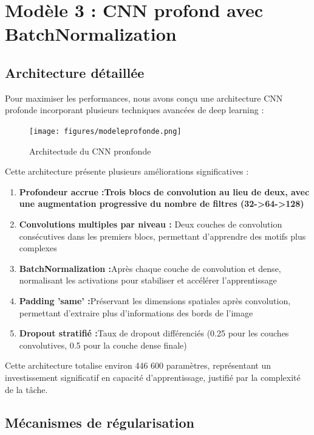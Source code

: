 \section{Modèle 3 : CNN profond avec BatchNormalization}

\subsection{Architecture détaillée}
\begin{flushleft}
Pour maximiser les performances, nous avons conçu une architecture CNN profonde incorporant plusieurs techniques avancées de deep learning :
\end{flushleft}

\begin{figure}[H]
\centering
\texttt{[image: figures/modeleprofonde.png]}
\caption{Architectude du CNN pronfonde}
\label{fig:urdu_CNN}
\end{figure}

\begin{flushleft}
Cette architecture présente plusieurs améliorations significatives :

\begin{enumerate}
\item \textbf{Profondeur accrue :Trois blocs de convolution au lieu de deux, avec une augmentation progressive du nombre de filtres (32->64->128)}
\item \textbf{Convolutions multiples par niveau : }Deux couches de convolution consécutives dans les premiers blocs, permettant d'apprendre des motifs plus complexes
\item \textbf{BatchNormalization :}Après chaque couche de convolution et dense, normalisant les activations pour stabiliser et accélérer l'apprentissage
\item \textbf{Padding 'same' :}Préservant les dimensions spatiales après convolution, permettant d'extraire plus d'informations des bords de l'image
\item \textbf{Dropout stratifié :}Taux de dropout différenciés (0.25 pour les couches convolutives, 0.5 pour la couche dense finale)
\end{enumerate}
\bigskip
Cette architecture totalise environ 446 600 paramètres, représentant un investissement significatif en capacité d'apprentissage, justifié par la complexité de la tâche.
\end{flushleft}

\subsection{Mécanismes de régularisation}

